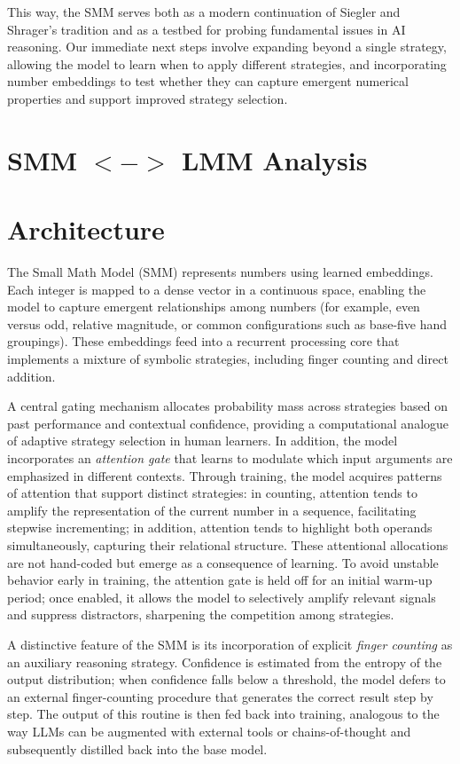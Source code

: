 \documentclass{article}
\begin{document}
This way, the SMM serves both as a modern continuation of Siegler and Shrager’s tradition and as a testbed for probing fundamental issues in AI reasoning. Our immediate next steps involve expanding beyond a single strategy, allowing the model to learn when to apply different strategies, and incorporating number embeddings to test whether they can capture emergent numerical properties and support improved strategy selection. 

\section{SMM $<->$ LMM Analysis}

\section{Architecture}

The Small Math Model (SMM) represents numbers using learned embeddings. Each integer is mapped to a dense vector in a continuous space, enabling the model to capture emergent relationships among numbers (for example, even versus odd, relative magnitude, or common configurations such as base-five hand groupings). These embeddings feed into a recurrent processing core that implements a mixture of symbolic strategies, including finger counting and direct addition.

A central gating mechanism allocates probability mass across strategies based on past performance and contextual confidence, providing a computational analogue of adaptive strategy selection in human learners. In addition, the model incorporates an \emph{attention gate} that learns to modulate which
input arguments are emphasized in different contexts. Through training, the model acquires patterns of attention that support distinct strategies: in counting, attention tends to amplify the representation of the current number in a sequence, facilitating stepwise incrementing; in addition, attention tends to highlight both operands simultaneously, capturing their relational structure. These attentional allocations are not hand-coded but emerge as a consequence of learning. To avoid unstable behavior early in training, the attention gate is held off for an initial warm-up period; once enabled, it allows the model to selectively amplify relevant signals and suppress distractors, sharpening the competition among strategies.

A distinctive feature of the SMM is its incorporation of explicit \emph{finger counting} as an auxiliary reasoning strategy. Confidence is estimated from the entropy of the output distribution; when confidence falls below a threshold, the model defers to an external finger-counting procedure that generates the correct result step by step. The output of this routine is then fed back into training, analogous to the way LLMs can be augmented with external tools or chains-of-thought and subsequently distilled back into the base model.
\end{document}
